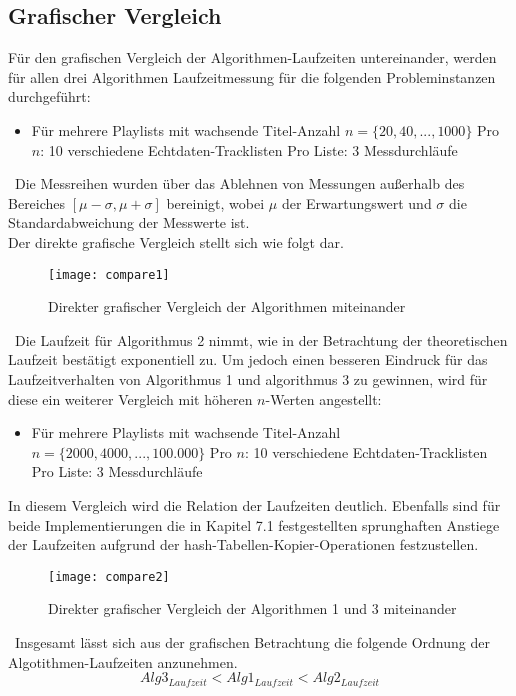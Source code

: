 \documentclass[
10pt, %
a4paper, %
oneside, %
headinclude,footinclude, %
BCOR5mm, %
]{scrartcl}
\begin{document}
\subsection{Grafischer Vergleich}
Für den grafischen Vergleich der Algorithmen-Laufzeiten untereinander, werden für allen drei Algorithmen Laufzeitmessung für die folgenden Probleminstanzen durchgeführt:
\begin{itemize}[noitemsep]
	\item Für mehrere Playlists mit wachsende Titel-Anzahl \(n = \{20,40,...,1000\}\)
	\subitem Pro \(n\): 10 verschiedene Echtdaten-Tracklisten
	\subsubitem Pro Liste: 3 Messdurchläufe
\end{itemize}\
Die Messreihen wurden über das Ablehnen von Messungen außerhalb des Bereiches \([\mu-\sigma,\mu+\sigma]\) bereinigt, wobei \(\mu\) der Erwartungswert und \(\sigma\) die Standardabweichung der Messwerte ist.\\
Der direkte grafische Vergleich stellt sich wie folgt dar.\\
\begin{figure}[h!]
	\centering 
	\texttt{[image: compare1]} 
	\caption[]{Direkter grafischer Vergleich der Algorithmen miteinander}
\end{figure}\
Die Laufzeit für Algorithmus 2 nimmt, wie in der Betrachtung der theoretischen Laufzeit bestätigt exponentiell zu. Um jedoch einen besseren Eindruck für das Laufzeitverhalten von Algorithmus 1 und algorithmus 3 zu gewinnen, wird für diese ein weiterer Vergleich mit höheren \(n\)-Werten angestellt:\\
\begin{itemize}[noitemsep]
	\item Für mehrere Playlists mit wachsende Titel-Anzahl \(n = \{2000,4000,...,100.000\}\)
	\subitem Pro \(n\): 10 verschiedene Echtdaten-Tracklisten
	\subsubitem Pro Liste: 3 Messdurchläufe
\end{itemize}
In diesem Vergleich wird die Relation der Laufzeiten deutlich. Ebenfalls sind für beide Implementierungen die in Kapitel 7.1 festgestellten sprunghaften Anstiege der Laufzeiten aufgrund der hash-Tabellen-Kopier-Operationen festzustellen.
\pagebreak
\begin{figure}[h!]
	\centering 
	\texttt{[image: compare2]} 
	\caption[]{Direkter grafischer Vergleich der Algorithmen 1 und 3 miteinander}
\end{figure}\
Insgesamt lässt sich aus der grafischen Betrachtung die folgende Ordnung der Algotithmen-Laufzeiten anzunehmen.\\
\begin{equation}
Alg3_{Laufzeit} < Alg1_{Laufzeit} < Alg2_{Laufzeit}
\end{equation}\
\end{document}
